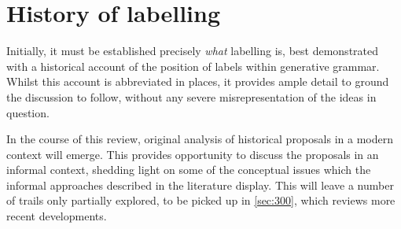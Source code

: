 \section{History of labelling}\label{sec:200}

Initially, it must be established precisely \emph{what} labelling is, best demonstrated with a historical account of the position of labels within generative grammar. Whilst this account is abbreviated in places, it provides ample detail to ground the discussion to follow, without any severe misrepresentation of the ideas in question.

In the course of this review, original analysis of historical proposals in a modern context will emerge. This provides opportunity to discuss the proposals in an informal context, shedding light on some of the conceptual issues which the informal approaches described in the literature display. This will leave a number of trails only partially explored, to be picked up in \autoref{sec:300}, which reviews more recent developments.














